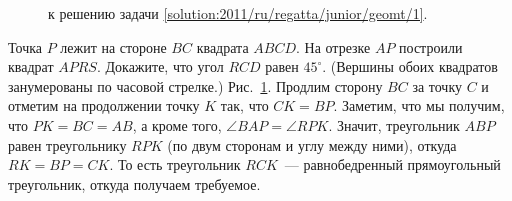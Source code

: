 \ifsolution
\begin{figure}\centering
    \caption{к решению задачи \ref{solution:2011/ru/regatta/junior/geomt/1}.}
    \label{fig:solution:2011/ru/regatta/junior/geomt/1}
\end{figure}%
\fi %

\problem
Точка $P$ лежит на стороне $BC$ квадрата $ABCD$.
На отрезке $AP$ построили квадрат $APRS$.
Докажите, что угол $RCD$ равен $45^\circ$.
(Вершины обоих квадратов занумерованы по часовой стрелке.)
\solution
\label{solution:2011/ru/regatta/junior/geomt/1}%
Рис.~\ref{fig:solution:2011/ru/regatta/junior/geomt/1}.
Продлим сторону $BC$ за точку $C$ и отметим на продолжении точку $K$ так, что
$C K = B P$.
Заметим, что мы получим, что $PK = BC = AB$, а кроме того,
$\angle BAP = \angle RPK$.
Значит, треугольник $ABP$ равен треугольнику $RPK$
(по двум сторонам и углу между ними),
откуда $RK = BP = CK$.
То есть треугольник $RCK$~--- равнобедренный прямоугольный треугольник, откуда
получаем требуемое.
\endproblem
